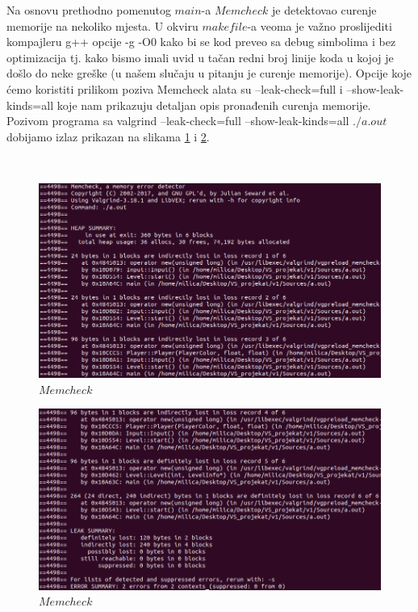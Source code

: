 \documentclass[a4paper]{article}
\begin{document}
Na osnovu prethodno pomenutog $main$-a $Memcheck$ je detektovao curenje memorije na nekoliko mjesta. U okviru $makefile$-a veoma je važno proslijediti kompajleru g++ opcije -g -O0 kako bi se kod preveo sa debug simbolima i bez optimizacija tj. kako bismo imali uvid u tačan redni broj linije koda u kojoj je došlo do neke greške (u našem slučaju u pitanju je curenje memorije). Opcije koje ćemo koristiti prilikom poziva Memcheck alata su --leak-check=full i --show-leak-kinds=all koje nam prikazuju detaljan opis pronađenih curenja memorije. Pozivom programa sa valgrind --leak-check=full --show-leak-kinds=all $./a.out$ dobijamo izlaz prikazan na slikama \ref{fig:mem1} i \ref{fig:mem2}.

\begin{verbatim}
	
\end{verbatim}

	\begin{figure}[h!]
		\caption{$Memcheck$}
		\label{fig:mem1}
		\includegraphics[scale=0.5]{../Valgrind/Memcheck/mem1.png}
	\end{figure}
	\begin{figure}[h!]
		\caption{$Memcheck$}
		\label{fig:mem2}
		\includegraphics[scale=0.5]{../Valgrind/Memcheck/mem2.png}
	\end{figure}
	
\end{document}

